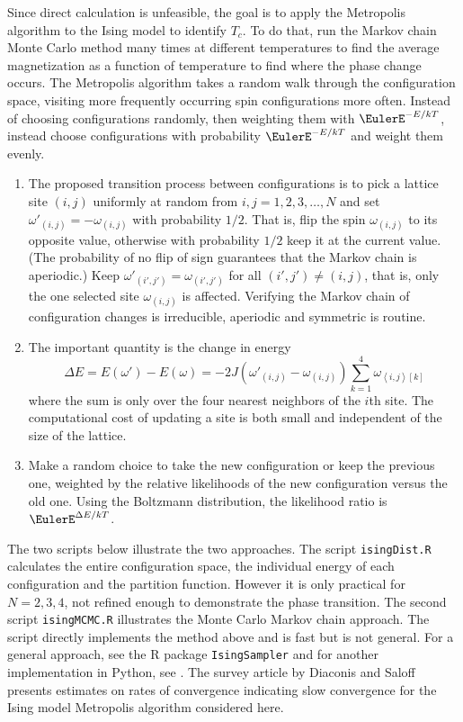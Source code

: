 \documentclass[12pt]{article}
\begin{document}
Since direct calculation is unfeasible, the goal is to apply the
Metropolis algorithm to the Ising model to identify \( T_c \).  To do
that, run the Markov chain Monte Carlo method many times at different
temperatures to find the average magnetization as a function of
temperature to find where the phase change occurs.  The Metropolis
algorithm takes a random walk through the configuration space, visiting
more frequently occurring spin configurations more often.  Instead of
choosing configurations randomly, then weighting them with \( \EulerE^{-E/kT}
\), instead choose configurations with probability \( \EulerE^{-E/kT} \)
and weight them evenly.
\begin{enumerate}
    \item
        The proposed transition process between configurations is to
        pick a lattice site \( (i, j) \) uniformly at random from \( i,
        j = 1, 2, 3, \dots, N \) and set \( \omega'_{(i,j)} = -\omega_{(i,j)}
        \) with probability \( 1/2 \).  That is, flip the spin \( \omega_
        {(i,j)} \) to its opposite value, otherwise with probability \(
        1/2 \) keep it at the current value.  (The probability of no
        flip of sign guarantees that the Markov chain is aperiodic.)
        Keep \( \omega'_{(i', j')}
        = \omega_{(i',j')} \) for all \( (i', j') \ne (i, j) \), that
        is, only the one selected site \( \omega_{(i,j)} \) is affected.
        Verifying the Markov chain of configuration changes is
        irreducible, aperiodic and symmetric is routine.
    \item
        The important quantity is the change in energy
        \[
            \Delta E = E(\omega') - E(\omega) = -2J (\omega'_{(i,j)} -
            \omega_{(i,j)}) \sum\limits_{k=1}^4\omega_{\left\langle i,j
            \right\rangle[k]}
        \] where the sum is only over the four nearest neighbors of the \(
        i \)th site.  The computational cost of updating a site is both
        small and independent of the size of the lattice.
    \item
        Make a random choice to take the new configuration or keep the
        previous one, weighted by the relative likelihoods of the new
        configuration versus the old one.  Using the Boltzmann
        distribution, the likelihood ratio is \( \EulerE^{\Delta E/kT} \).
\end{enumerate}

The two scripts below illustrate the two approaches.  The script \texttt
{isingDist.R} calculates the entire configuration space, the individual
energy of each configuration and the partition function. However it is
only practical for \( N = 2, 3, 4 \), not refined enough to demonstrate
the phase transition.  The second script \texttt{isingMCMC.R}
illustrates the Monte Carlo Markov chain approach.  The script directly
implements the method above and is fast but is not general.  For a
general approach, see the R package \texttt{IsingSampler}
\cite{epskamp20} and for another implementation in Python, see
\cite{schlusser18}.  The survey article by Diaconis and Saloff
\cite{DIACONIS199820} presents estimates on rates of convergence
indicating slow convergence for the Ising model Metropolis algorithm
considered here.
\end{document}
